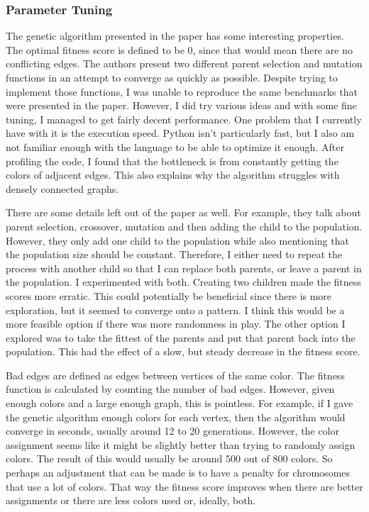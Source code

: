 \documentclass[12]{article}
\begin{document}
\subsubsection{Parameter Tuning}
The genetic algorithm presented in the paper has some interesting properties. The optimal fitness score is defined to be 0, since that would mean there are no conflicting edges.  The authors present two different parent selection and mutation functions in an attempt to converge as quickly as possible. Despite trying to implement those functions, I was unable to reproduce the same benchmarks that were presented in the paper. However, I did try various ideas and with some fine tuning, I managed to get fairly decent performance. One problem that I currently have with it is the execution speed. Python isn't particularly fast, but I also am not familiar enough with the language to be able to optimize it enough. After profiling the code, I found that the bottleneck is from constantly getting the colors of adjacent edges. This also explains why the algorithm struggles with densely connected graphs.

There are some details left out of the paper as well. For example, they talk about parent selection, crossover, mutation and then adding the child to the population. However, they only add one child to the population while also mentioning that the population size should be constant. Therefore, I either need to repeat the process with another child so that I can replace both parents, or leave a parent in the population. I experimented with both. Creating two children made the fitness scores more erratic. This could potentially be beneficial since there is more exploration, but it seemed to converge onto a pattern. I think this would be a more feasible option if there was more randomness in play. The other option I explored was to take the fittest of the parents and put that parent back into the population. This had the effect of a slow, but steady decrease in the fitness score.

Bad edges are defined as edges between vertices of the same color. The fitness function is calculated by counting the number of bad edges. However, given enough colors and a large enough graph, this is pointless. For example, if I gave the genetic algorithm enough colors for each vertex, then the algorithm would converge in seconds, usually around 12 to 20 generations. However, the color assignment seems like it might be slightly better than trying to randomly assign colors. The result of this would usually be around 500 out of 800 colors. So perhaps an adjustment that can be made is to have a penalty for chromosomes that use a lot of colors. That way the fitness score improves when there are better assignments or there are less colors used or, ideally, both.
\end{document}
